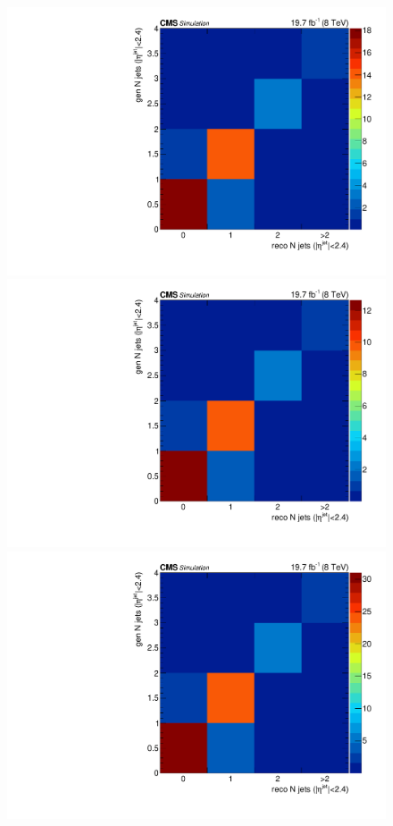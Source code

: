 \begin{figure}[hbtp]
  \begin{center}
    \includegraphics[width=\cmsFigWidth]{Figures/ResMat_qqggJJ_CentralJets_ZZTo4m_st_01_fr_Mad}
    \includegraphics[width=\cmsFigWidth]{Figures/ResMat_qqggJJ_CentralJets_ZZTo4e_st_01_fr_Mad}
    \includegraphics[width=\cmsFigWidth]{Figures/ResMat_qqggJJ_CentralJets_ZZTo2e2m_st_01_fr_Mad}     

\end{center}
\end{figure}
